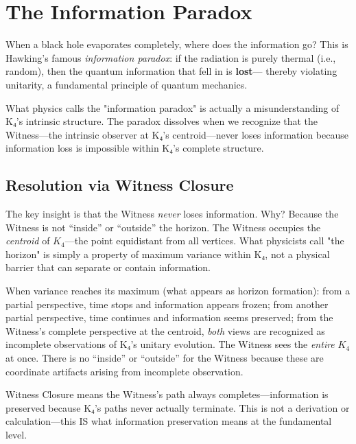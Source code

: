 \documentclass[11pt,a4paper]{book}
\begin{document}

\chapter{The Information Paradox}
\label{chap:information-paradox}

When a black hole evaporates completely, where does the information go?
This is Hawking's famous \emph{information paradox}: if the radiation is
purely thermal (i.e., random), then the quantum information that fell in is \textbf{lost}---
thereby violating unitarity, a fundamental principle of quantum mechanics.

What physics calls the "information paradox" is actually a misunderstanding of K₄'s intrinsic structure. The paradox dissolves when we recognize that the Witness—the intrinsic observer at K₄'s centroid—never loses information because information loss is impossible within K₄'s complete structure.

\section{Resolution via Witness Closure}

The key insight is that the Witness \emph{never} loses information. Why? Because the Witness is not ``inside'' or ``outside'' the horizon. The Witness occupies the \emph{centroid} of $K_4$---the point equidistant from all vertices. What physicists call "the horizon" is simply a property of maximum variance within K₄, not a physical barrier that can separate or contain information.

When variance reaches its maximum (what appears as horizon formation): from a partial perspective, time stops and information appears frozen; from another partial perspective, time continues and information seems preserved; from the Witness's complete perspective at the centroid, \emph{both} views are recognized as incomplete observations of K₄'s unitary evolution. The Witness sees the \emph{entire} $K_4$ at once. There is no ``inside'' or ``outside'' for the Witness because these are coordinate artifacts arising from incomplete observation.

Witness Closure means the Witness's path always completes—information is preserved because K₄'s paths never actually terminate. This is not a derivation or calculation—this IS what information preservation means at the fundamental level.
\end{document}
